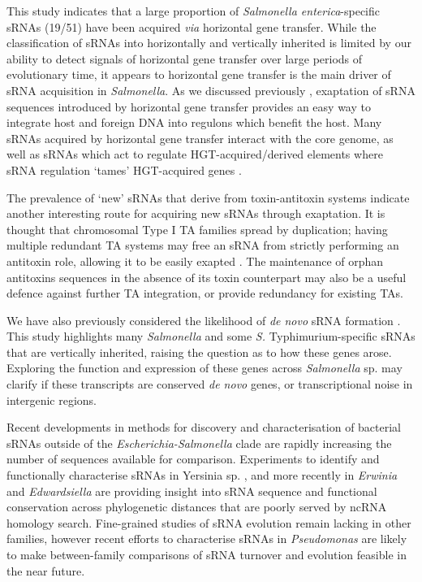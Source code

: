 This study indicates that a large proportion of \textit{Salmonella enterica}-specific sRNAs (19/51) have been acquired \textit{via} horizontal gene transfer. While the classification of sRNAs into horizontally and vertically inherited is limited by our ability to detect signals of horizontal gene transfer over large periods of evolutionary time, it appears to horizontal gene transfer is the main driver of sRNA acquisition in \textit{Salmonella}. As we discussed previously \citep{Jose2019-wi}, exaptation of sRNA sequences introduced by horizontal gene transfer provides an easy way to integrate host and foreign DNA into regulons which benefit the host. Many sRNAs acquired by horizontal gene transfer interact with the core genome, as well as sRNAs which act to regulate HGT-acquired/derived elements \citep{Frohlich2016-mj} where sRNA regulation `tames' HGT-acquired genes \citep{Papenfort2010-cj}. 

The prevalence of `new' sRNAs that derive from toxin-antitoxin systems indicate another interesting route for acquiring new sRNAs through exaptation. It is thought that chromosomal Type I TA families spread by duplication; having multiple redundant TA systems may free an sRNA from strictly performing an antitoxin role, allowing it to be easily exapted \citep{Jose2019-wi}. The maintenance of orphan antitoxins sequences in the absence of its toxin counterpart may also be a useful defence against further TA integration, or provide redundancy for existing TAs.

We have also previously considered the likelihood of \textit{de novo} sRNA formation \citep{Jose2019-wi}. This study highlights many \textit{Salmonella} and some \textit{S.} Typhimurium-specific sRNAs that are vertically inherited, raising the question as to how these genes arose. Exploring the function and expression of these genes across \textit{Salmonella} sp. may clarify if these transcripts are conserved \textit{de novo} genes, or transcriptional noise in intergenic regions. 

Recent developments in methods for discovery and characterisation of bacterial sRNAs outside of the \textit{Escherichia-Salmonella} clade are rapidly increasing the number of sequences available for comparison. Experiments to identify and functionally characterise sRNAs in Yersinia sp. \citep{Yan2013-ga,Martinez-Chavarria2015-bh,Han2019-bg}, and more recently in \textit{Erwinia} \citep{Schachterle2019-rccq} and \textit{Edwardsiella} \citep{Gao2019-gh} are providing insight into sRNA sequence and functional conservation across phylogenetic distances that are poorly served by ncRNA homology search. Fine-grained studies of sRNA evolution remain lacking in other families, however recent efforts to characterise sRNAs in \textit{Pseudomonas} \citep{Pita2018-bxxi,Gomez-Lozano2012-xe,Gomez-Lozano2015-yx,Filiatrault2010-jmc} are likely to make between-family comparisons of sRNA turnover and evolution feasible in the near future. 


